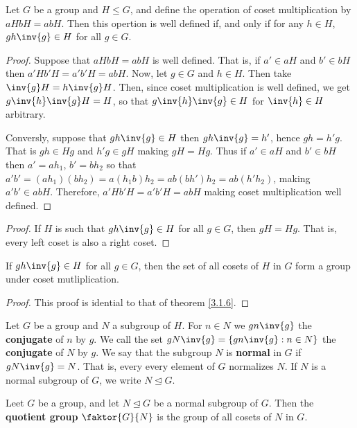 \begin{theorem}\label{3.2.3}
    Let $G$ be a group and  $H \leq G$, and define the operation of coset
    multiplication by  $aHbH=abH$. Then this opertion is well defined if, and
    only if for any  $h \in H$,  $gh\inv{g} \in H$ for all $g \in G$.
\end{theorem}
\begin{proof}
    Suppose that $aHbH=abH$ is well defined. That is, if  $a' \in aH$ and $b'
    \in bH$ then  $a'Hb'H=a'b'H=abH$. Now, let  $g \in G$ and  $h \in H$. Then
    take $\inv{g}H=h\inv{g}H$. Then, since coset multiplication is well defined,
    we get $g\inv{h}\inv{g}H=H$, so that $g\inv{h}\inv{g} \in H$ for $\inv{h} \in
    H$ arbitrary.

    Conversly, suppose that $gh\inv{g} \in H$ then $gh\inv{g}=h'$, hence
    $gh=h'g$. That is  $gh \in Hg$ and  $h'g \in gH$ making  $gH=Hg$. Thus if
    $a' \in aH$ and $b' \in bH$ then  $a'=ah_1$, $b'=bh_2$ so that
    $a'b'=(ah_1)(bh_2)=a(h_1b)h_2=ab(bh')h_2=ab(h'h_2)$, making $a'b' \in abH$.
    Therefore, $a'Hb'H=a'b'H=abH$ making coset multiplication well defined.
\end{proof}
\begin{proof}
    If $H$ is such that $gh\inv{g} \in H$ for all $g \in G$, then  $gH=Hg$. That
    is, every left coset is also a right coset.
\end{proof}
\begin{corollary}
    If $gh\inv{g} \in H$ for all $g \in G$, then the set of all cosets of  $H$
    in  $G$ form a group under coset mutliplication.
\end{corollary}
\begin{proof}
    This proof is idential to that of theorem \ref{3.1.6}.
\end{proof}

\begin{definition}
    Let $G$ be a group and $N$ a subgroup of  $H$. For  $n \in N$ we
    $gn\inv{g}$ the \textbf{conjugate} of $n$ by  $g$. We call the set
    $gN\inv{g}=\{gn\inv{g} : n \in N\}$ the \textbf{conjugate} of $N$ by $g$. We
    say that the subgroup $N$ is \textbf{normal} in $G$ if $gN\inv{g}=N$. That
    is, every every element of $G$ normalizes  $N$. If  $N$ is a normal subgroup
    of  $G$, we write  $N \unlhd G$.
\end{definition}

\begin{definition}
    Leet $G$ be a group, and let $N \unlhd G$ be a normal subgroup of $G$. Then
    the  \textbf{quotient group} $\faktor{G}{N}$ is the group of all cosets of
    $N$ in  $G$.
\end{definition}

